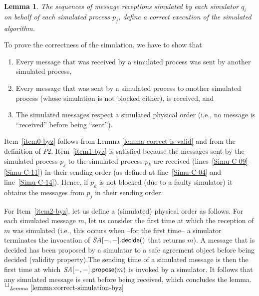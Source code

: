 \documentclass[11pt,letterpaper]{article}
\newtheorem{lemma}{Lemma}
\newlength {\afterproof}
\newcommand{\toto}{xxx}
\newenvironment{proofL}{\noindent{\bf Proof }}
{\hspace*{\fill}$\Box_{\mathit{Lemma}~\ref{\toto}}$\par\vspace{\afterproof}}
\newcommand{\SA}{\mathit{SA}}
\begin{document}
\begin{lemma}
\label{lemma:correct-simulation-byz}
The sequences of message receptions simulated by each simulator $q_i$
on behalf of each simulated process $p_j$, define a correct execution of
the simulated algorithm.
\end{lemma}

\begin{proofL}
To prove the correctness of the simulation, we have  to show that
\begin{enumerate}
\vspace{-0.2cm}
\item
\label{item0-byz}
Every message that was received by a simulated process was sent
 by another simulated process,
\vspace{-0.2cm}
\item
\label{item1-byz}
Every message that was sent by a simulated process to another simulated
process (whose simulation is not blocked either), is received, and
\vspace{-0.2cm}
\item
\label{item2-byz}
The simulated messages respect a simulated physical order
(i.e., no message is ``received'' before being  ``sent'').
\end{enumerate}

Item~\ref{item0-byz} follows from Lemma \ref{lemma-correct-is-valid}
 and from the definition of $P2$.
Item~\ref{item1-byz} is satisfied because the messages sent by
the simulated process $p_j$ to the simulated process $p_k$ are received
(lines~\ref{Simu-C-09}-\ref{Simu-C-11}) in their sending order
(as defined at line~\ref{Simu-C-04}  and line~\ref{Simu-C-14}).
Hence, if $p_k$ is not blocked (due to a faulty simulator)
it obtains the messages from $p_j$ in their sending order.


For Item~\ref{item2-byz}, let us define a (simulated) physical order as follows.
For each simulated message $m$, let us consider the first time at which the
reception of $m$  was simulated (i.e., this occurs when
 --for the first time-- a simulator terminates  the invocation  of
$\SA[-,-].{\sf decide}()$  that returns $m$).
A message that is decided has been proposed by a simulator to a safe agreement
object before  being decided (validity property).The sending time  of a
simulated message is then the first time at which
$\SA[-,-].{\sf propose}(m)$ is  invoked by a simulator.
It follows that any simulated  message is sent before being received,
which concludes the lemma.
\renewcommand{\toto}{lemma:correct-simulation-byz}
\end{proofL}
\end{document}
